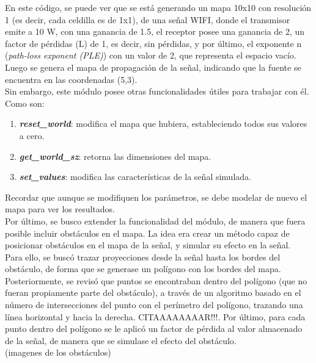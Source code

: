 En este código, se puede ver que se está generando un mapa 10x10 con resolución 1 (es decir, cada celdilla es de 1x1), de una señal WIFI, donde el transmisor emite a 10 W, con una ganancia de 1.5, el receptor posee una ganancia de 2, un factor de pérdidas (L) de 1, es decir, sin pérdidas, y por último, el exponente n (\emph{path-loss exponent (PLE)}) con un valor de 2, que representa el espacio vacío. Luego se genera el mapa de propagación de la señal, indicando que la fuente se encuentra en las coordenadas (5,3).\\

Sin embargo, este módulo posee otras funcionalidades útiles para trabajar con él. Como son:

\begin{enumerate}
    \item \textbf{\emph{reset\_world}}: modifica el mapa que hubiera, estableciendo todos sus valores a cero.
    
    \item \textbf{\emph{get\_world\_sz}}: retorna las dimensiones del mapa.
    
    \item \textbf{\emph{set\_values}}: modifica las características de la señal simulada.
\end{enumerate}

Recordar que aunque se modifiquen los parámetros, se debe modelar de nuevo el mapa para ver los resultados.\\

Por último, se busco extender la funcionalidad del módulo, de manera que fuera posible incluir obstáculos en el mapa. La idea era crear un método capaz de posicionar obstáculos en el mapa de la señal, y simular su efecto en la señal.\\

Para ello, se buscó trazar proyecciones desde la señal hasta los bordes del obstáculo, de forma que se generase un polígono con los bordes del mapa. Posteriormente, se revisó que puntos se encontraban dentro del polígono (que no fueran propiamente parte del obstáculo), a través de un algoritmo basado en el número de intersecciones del punto con el perímetro del polígono, trazando una línea horizontal y hacia la derecha. CITAAAAAAAAR!!!. Por último, para cada punto dentro del polígono se le aplicó un factor de pérdida al valor almacenado de la señal, de manera que se simulase el efecto del obstáculo.\\

(imagenes de los obstáculos)\\

